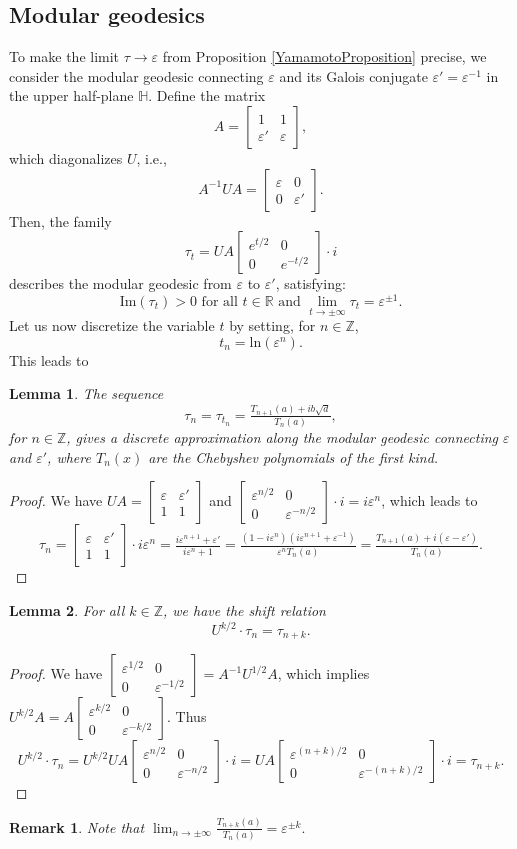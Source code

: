 \documentclass[11pt, a4paper]{amsart}
\newcommand{\mat}[1]{\begin{bmatrix}#1\end{bmatrix}}
\newcommand{\ep}{\varepsilon}
\newcommand{\eq}[1]{\begin{equation}#1\end{equation}}
\theoremstyle{plain}
\newtheorem{lemma}{Lemma}[section]
\newtheorem{remark}{Remark}[section]
\numberwithin{equation}{section}
\begin{document}
\subsection{Modular geodesics}
To make the limit $\tau \to \ep$ from Proposition \ref{YamamotoProposition} precise, we consider the modular geodesic connecting $\ep$ and its Galois conjugate $\ep ' = \ep ^{-1}$ in the upper half-plane $\mathbb H$. Define the matrix \eq{A = \begin{bmatrix} 1 & 1 \\ \ep ' & \ep \end{bmatrix},} which diagonalizes $U$, i.e., \eq{A^{-1}U A = \begin{bmatrix} \ep & 0 \\ 0 & \ep '\end{bmatrix}.} Then, the family \eq{\tau_t = U A \begin{bmatrix}e^{t/2} & 0 \\ 0 & e^{-t/2}\end{bmatrix} \cdot i} describes the modular geodesic from $\ep$ to $\ep '$, satisfying: \eq{\mathrm{Im}(\tau_t)>0 \text{ for all } t \in \mathbb R \text{ and }  \lim _{t\to \pm \infty} \tau_t = \ep^{\pm 1}.}
Let us now discretize the variable $t$ by setting, for $n \in \mathbb Z$, \eq{t_n = \mathrm{ln}(\ep^{n}).} This leads to 
\begin{lemma}
The sequence \eq{\tau_n = \tau_{t_n} = \tfrac{T_{n+1}(a) + i b \sqrt{d}}{T_n(a)},} for $n \in \mathbb Z$, gives a discrete approximation along the modular geodesic connecting $\ep$ and $\ep'$, where $T_n(x)$ are the Chebyshev polynomials of the first kind.
\end{lemma}
\begin{proof}
We have $UA = \mat{\ep & \ep' \\ 1 & 1}$ and $\mat{\ep^{n/2}&0\\0&\ep^{-n/2}} \cdot i = i \ep^n$, which leads to \eq{\tau_n = \mat{ \ep & \ep' \\ 1 & 1} \cdot i \ep^n = \tfrac{i\ep^{n+1}+\ep'}{i\ep^n+1} = \tfrac{(1-i\ep^n)(i\ep^{n+1}+\ep^{-1})}{\ep^n T_n(a)}=\tfrac{T_{n+1}(a)+i(\ep-\ep')}{T_n(a)}.}

\end{proof}

\begin{lemma}\label{LemmaAction}For all $k \in \mathbb Z$, we have the shift relation
\eq{U^{k/2} \cdot \tau_n = \tau_{n+k}.} 
\end{lemma}
\begin{proof}
We have $\mat{\ep^{1/2}&0 \\ 0 & \ep^{-1/2}} = A^{-1}U^{1/2}A$, which implies $U^{k/2}A = A \mat{\ep^{k/2}&0\\0&\ep^{-k/2}}$. Thus \eq{U^{k/2} \cdot \tau_n = U^{k/2} U A \mat{\ep^{n/2}&0\\0&\ep^{-n/2}}\cdot i = UA\mat{\ep^{(n+k)/2}&0\\0&\ep^{-(n+k)/2}}\cdot i = \tau_{n+k}.}
\end{proof}
\begin{remark}Note that $\lim _{n \to \pm \infty} \tfrac{T_{n+k}(a)}{T_n(a)} = \ep ^{\pm k}.$
\end{remark}
\end{document}
